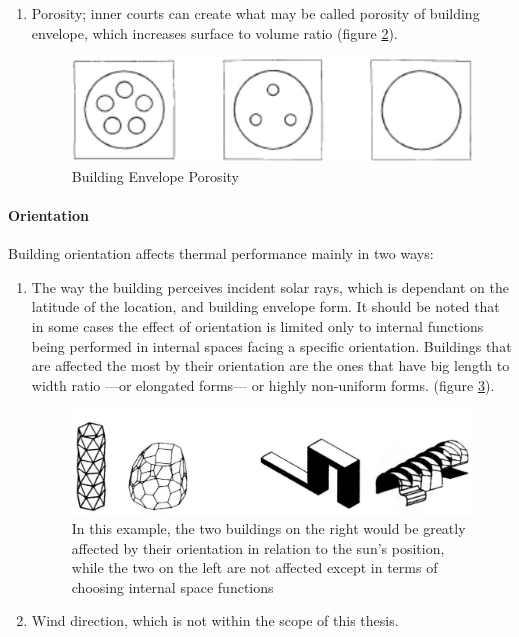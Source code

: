 \begin{enumerate}
\begin{figure}[H]
			\label{fig:Compaction}
		\end{figure}
	\item Porosity; inner courts can create what may be called porosity of building envelope, which increases surface to volume ratio (figure 		\ref{fig:Porosity}).
		\begin{figure}[H]
			\centering
			\includegraphics[width=\textwidth]{./Images/5-Porosity}
			\caption{Building Envelope Porosity}
			\label{fig:Porosity}
		\end{figure}
\end{enumerate}

\paragraph{Orientation}\mbox{}

Building orientation affects thermal performance mainly in two ways:
\begin{enumerate}
	\item The way the building perceives incident solar rays, which is dependant on the latitude of the location, and building envelope form. It should be noted that in some cases the effect of orientation is limited only to internal functions being performed in internal spaces facing a specific orientation. Buildings that are affected the most by their orientation are the ones that have big length to width ratio ---or elongated forms--- or highly non-uniform forms. (figure \ref{fig:orientation}).
		\begin{figure}[H]
			\centering
			\includegraphics[width=13cm]{./Images/6-Orientation}
			\caption[Effect of Building Orientation]{In this example, the two buildings on the right would be greatly affected by their orientation in relation to the sun's position, while the two on the left are not affected except in terms of choosing internal space functions \cite{foa04}}
			\label{fig:orientation}
		\end{figure}
	\item Wind direction, which is not within the scope of this thesis.
\end{enumerate}

